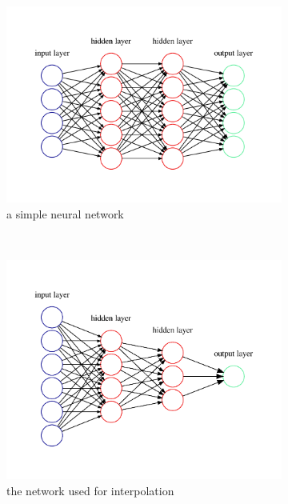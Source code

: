 \begin{figure}[h] %
	\centering
	\begin{subfigure}[t]{0.5\textwidth}
		\centering
		\includegraphics[width=\linewidth]{images/graphviz/general.pdf}
		\caption{a simple neural network}
		\label{fig:neuralnetwork-general}
	\end{subfigure}%
	~ 
	\begin{subfigure}[t]{0.5\textwidth}
		\centering
		\includegraphics[width=\linewidth]{images/graphviz/graph.pdf}
		\caption{the network used for interpolation}
		\label{fig:neuralnetwork-graph}
	\end{subfigure}
	\caption{}
	
\end{figure}

